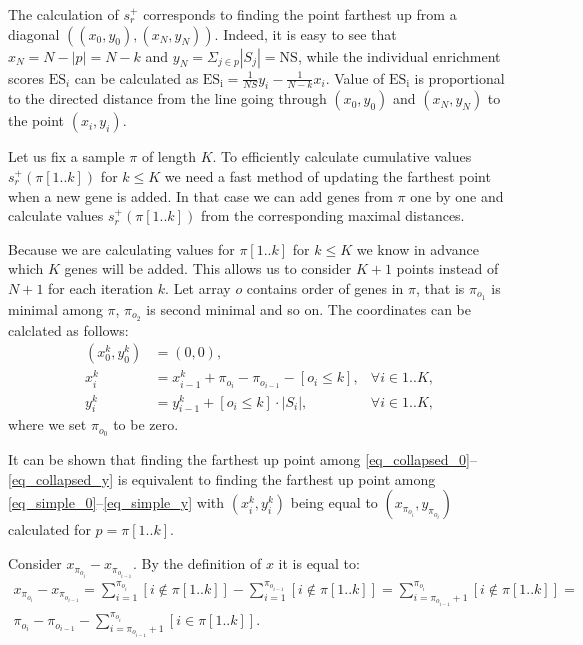 \documentclass[runningheads,a4paper]{llncs}
\begin{document}
The calculation of $s^+_r$ corresponds to finding the point
farthest up from a diagonal $\left((x_0, y_0), (x_N, y_N)\right)$. 
Indeed, it is easy to see that $x_N = N - |p| = N - k$ and
$y_N = \Sigma_{j \in p} |S_j| = \mathrm{NS}$,
while the individual enrichment scores $\mathrm{ES}_i$ 
can be calculated as 
$\mathrm{ES_i} = \frac{1}{NS} y_i - \frac{1}{N - k} x_i$.
Value of $\mathrm{ES_i}$ is proportional to the directed distance from 
the line going through $(x_0, y_0)$ and $(x_N, y_N)$ 
to the point $(x_i, y_i)$.

Let us fix a sample $\pi$ of length $K$.
To efficiently calculate cumulative values $s^+_r(\pi[1..k])$ for $k \le K$ we
need a fast method of updating the farthest point
when a new gene is added. In that case we can add genes
from $\pi$ one by one and calculate values $s^+_r(\pi[1..k])$ 
from the corresponding maximal distances.

Because we are calculating values for $\pi[1..k]$ for $k \le K$
we know in advance which $K$ genes will be added.
This allows us to consider $K+1$ points instead of $N+1$ for each iteration 
$k$. Let array $o$ contains order of genes in $\pi$, that is $\pi_{o_1}$
is minimal among $\pi$, $\pi_{o_2}$ is second minimal and so on.
The coordinates can be calclated as follows:
\begin{align}
    \label{eq_collapsed_0}
    (x^k_0, y^k_0) &= (0, 0), & \\ 
    \label{eq_collapsed_x}
    x^k_i &= x^k_{i-1} + \pi_{o_i} - \pi_{o_{i-1}} - \left[o_i \le k\right],       &\forall i \in 1..K, \\
    \label{eq_collapsed_y}
    y^k_i &= y^k_{i-1} + \left[o_i \le k \right] \cdot |S_i|, &\forall i \in 1..K,
\end{align}
where we set $\pi_{o_0}$ to be zero.

It can be shown that finding the farthest up point among 
\eqref{eq_collapsed_0}--\eqref{eq_collapsed_y} is
equivalent to finding the farthest up point among 
\eqref{eq_simple_0}--\eqref{eq_simple_y} 
with $(x^k_i, y^k_i)$ being equal to $(x_{\pi_{o_i}}, y_{\pi_{o_i}})$
calculated for $p = \pi[1..k]$.

Consider $x_{\pi_{o_i}} - x_{\pi_{o_{i-1}}}$. By the definition of $x$ 
it is equal to:
\begin{multline*}
    x_{\pi_{o_i}} - x_{\pi_{o_{i-1}}} = 
        \sum_{i=1}^{\pi_{o_i}} [i \not \in \pi [1..k]] - 
        \sum_{i=1}^{\pi_{o_{i-1}}} [i \not \in \pi [1..k]] =  
        \sum_{i=\pi_{o_{i-1}} + 1}^{\pi_{o_i}} [i \not \in \pi [1..k]] = \\
        \pi_{o_i} - \pi_{o_{i-1}} - \sum_{i=\pi_{o_{i-1}} + 1}^{\pi_{o_i}} [i \in \pi [1..k]].
\end{multline*}
\end{document}
